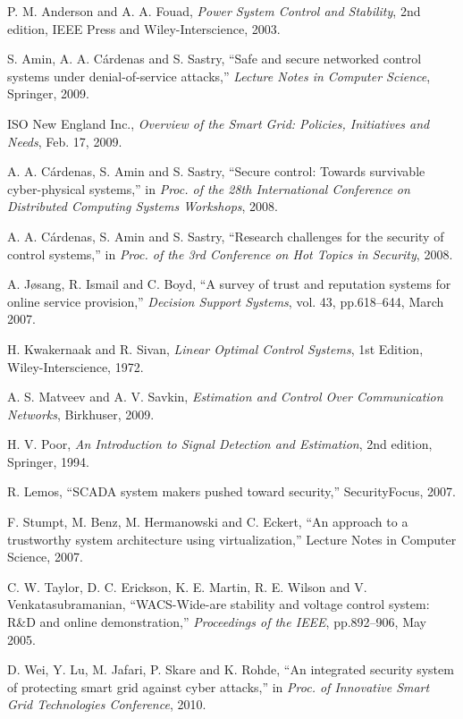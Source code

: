 \documentclass[journal,10pt,twocolumn]{IEEEtran}
\begin{document}
\begin{thebibliography}{11}
P. M. Anderson and A. A. Fouad, {\em Power System Control and Stability}, 2nd edition, IEEE Press and Wiley-Interscience, 2003.


S. Amin, A. A. C\'{a}rdenas and S. Sastry, ``Safe and secure networked control systems under denial-of-service attacks,'' {\em Lecture Notes in Computer Science}, Springer, 2009.


ISO New England Inc., {\em Overview of the Smart Grid: Policies, Initiatives and Needs}, Feb. 17, 2009.

A. A. C\'{a}rdenas, S. Amin and S. Sastry, ``Secure control: Towards survivable cyber-physical systems,'' in {\em Proc. of the 28th International Conference on Distributed Computing Systems Workshops}, 2008.

A. A. C\'{a}rdenas, S. Amin and S. Sastry, ``Research challenges for the security of control systems,'' in {\em Proc. of the 3rd Conference on Hot Topics in Security}, 2008.

A. J{\o}sang, R. Ismail and C. Boyd, ``A survey of trust and reputation systems for online service provision,'' {\em Decision Support Systems}, vol. 43, pp.618--644, March 2007.

H. Kwakernaak and R. Sivan, {\em Linear Optimal Control Systems}, 1st Edition, Wiley-Interscience, 1972.

A. S. Matveev and A. V. Savkin, {\em Estimation and Control Over Communication Networks}, Birkhuser, 2009.

H. V. Poor, {\em An Introduction to Signal Detection and Estimation}, 2nd edition, Springer, 1994.


R. Lemos, ``SCADA system makers pushed toward security,'' SecurityFocus, 2007.

F. Stumpt, M. Benz, M. Hermanowski and C. Eckert, ``An approach to a trustworthy system architecture using virtualization,'' Lecture Notes in Computer Science, 2007.



C. W. Taylor, D. C. Erickson, K. E. Martin, R. E. Wilson and V. Venkatasubramanian, ``WACS-Wide-are stability and voltage control system: R\&D and online demonstration,'' {\em Proceedings of the IEEE}, pp.892--906, May 2005.



D. Wei, Y. Lu, M. Jafari, P. Skare and K. Rohde, ``An integrated security system of protecting smart grid against cyber attacks,'' in {\em Proc. of Innovative Smart Grid Technologies Conference}, 2010.


\end{thebibliography}
\end{document}
